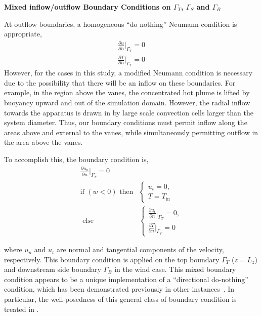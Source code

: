\textbf{Mixed inflow/outflow Boundary Conditions on $\Gamma_T$,
$\Gamma_S$ and $\Gamma_B$}  

At outflow boundaries, a homogeneous ``do nothing'' Neumann condition is
appropriate\cite{Rannacher2000}, 
\begin{align}
  \frac{\partial u}{\partial n}\bigg|_{\Gamma_T} = 0 \\
  \frac{\partial T}{\partial n}\bigg|_{\Gamma_T} = 0
\end{align}
However, for the cases in this study, a modified Neumann condition is
necessary due to the possibility that there will be an inflow on these
boundaries. 
For example, in the region above the vanes, the concentrated hot plume is
lifted by buoyancy upward and out of the simulation domain. However, the
radial inflow towards the apparatus is drawn in by large scale
convection cells larger than the system diameter. Thus, our boundary
conditions must permit inflow along the areas above and external to the
vanes, while simultaneously permitting outflow in the area above the vanes. 


To accomplish this, the boundary condition is,
\begin{align}
  \frac{\partial u_n}{\partial n}\bigg|_{\Gamma_T} = 0 \\
  \text{if } (w<0) \text{ then}& \begin{cases}
    u_t = 0,\\
    T = T_{\text{in}}
  \end{cases} \\
  \text{ else}& \begin{cases}
    \frac{\partial u_t}{\partial n}\bigg|_{\Gamma_T} = 0, \\  
    \frac{\partial T}{\partial n}\bigg|_{\Gamma_T} = 0
  \end{cases}
\end{align}

where $u_n$ and $u_t$ are normal and tangential components of the velocity, 
respectively. This boundary condition is applied on the top boundary
$\Gamma_T$ ($z=L_z$) and downstream side boundary  $\Gamma_B$ in the
wind case. This mixed boundary condition appears to be a unique
implementation of a ``directional do-nothing'' condition, which has been
demonstrated previously in other
instances~\cite{braack2014directional,feistauer2006non}. In particular,
the well-posedness of this general class of boundary condition is
treated in \cite{bruneau1996new}.  

